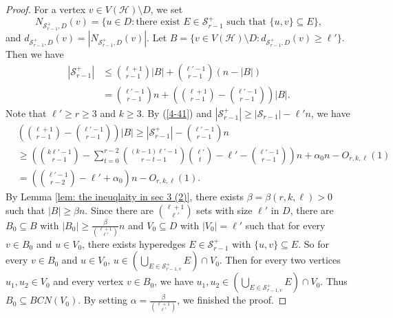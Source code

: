 \documentclass[10pt,a4paper]{amsart}
\newcommand{\mh}{\mathcal{H}}
\begin{document}
\begin{proof}
     For a vertex $v\in V(\mh)\setminus D$, we set $$N_{\mathcal{S}_{r-1}^+,D}(v)=\{u\in D: \text{there exist $E\in \mathcal{S}_{r-1}^+$ such that $\{u,v\}\subseteq E$}\},$$ and  $d_{\mathcal{S}_{r-1}^+,D}(v)=|N_{\mathcal{S}_{r-1}^+,D}(v)|$.
    Let $B=\{v\in V(\mh)\setminus D:d_{\mathcal{S}_{r-1}^+,D}(v)\geq \ell'\}$. Then we have
     \begin{equation*}
         \begin{aligned}
             \left|\mathcal{S}_{r-1}^+\right|&\leq \binom{\ell+1}{r-1}|B|+\binom{\ell'-1}{r-1}(n-|B|)\\
             &= \binom{\ell'-1}{r-1}n+\left( \binom{\ell+1}{r-1}-\binom{\ell'-1}{r-1} \right)|B|.
         \end{aligned}
     \end{equation*}
     Note that  $\ell'\geq r\geq 3$ and $k\geq 3$. By (\ref{4-41}) and $|\mathcal{S}_{r-1}^+|\geq |\mathcal{S}_{r-1}|-\ell' n$, we have
      \begin{equation*}
         \begin{aligned}
             &\left( \binom{\ell+1}{r-1}-\binom{\ell'-1}{r-1} \right)|B|\geq \left| \mathcal{S}_{r-1}^+\right|-\binom{\ell'-1}{r-1}n\\
             &\geq \left(\binom{k\ell'-1}{r-1}-\sum_{t=0}^{r-2}\binom{(k-1)\ell'-1}{r-t-1}\binom{\ell'}{t}-\ell'-\binom{\ell'-1}{r-1} \right)n
             +\alpha_0 n-O_{r,k,\ell}(1)   \\
             &= \left(\binom{\ell'-1}{r-2}-\ell'+\alpha_0 \right)n-O_{r,k,\ell}(1).
         \end{aligned}
     \end{equation*}
     By Lemma \ref{lem: the ineuqlaity in sec 3 (2)}, there exists $\beta=\beta(r,k,\ell)>0$ such that $|B|\geq \beta n$.
     Since there are $\binom{\ell+1}{\ell'}$ sets with size $\ell'$ in $D$, there are $B_0\subseteq B$ with  $|B_0|\ge\frac{\beta }{\binom{\ell+1}{\ell'}}n$ and $V_0\subseteq D$ with $|V_0|=\ell'$ such that for every $v\in B_0$ and $u\in V_0$, there exists hyperedges $E\in \mathcal{S}_{r-1}^+$ with $\{u,v\}\subseteq E$.
So for every $v\in B_0$ and $u\in V_0$, $u\in \left(\bigcup_{E\in \mathcal{S}_{r-1,v}^+}E\right)\cap V_0$.
     Then for every two vertices $u_1,u_2\in V_0$ and every vertex $v\in B_0$, we have $u_1,u_2\in  \left(\bigcup_{E\in \mathcal{S}_{r-1,v}^+}E\right)\cap V_0$. Thus $B_0\subseteq BCN(V_0)$.
    By setting $\alpha=\frac{\beta}{\binom{\ell+1}{\ell'}}$, we finished the proof.
 \end{proof}
\end{document}
